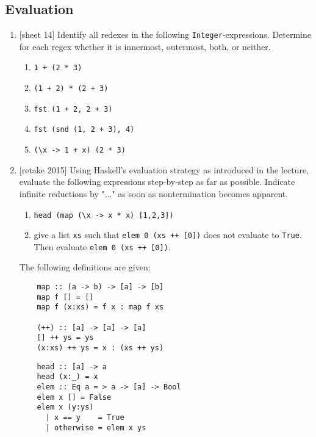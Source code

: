 \documentclass{article}
\def\code#1{\texttt{#1}}
\begin{document}
\subsection{Evaluation}
\begin{enumerate}
    \item {[sheet 14]} Identify all redexes in the following \code{Integer}-expressions. Determine for each regex whether it is innermost, outermost, both, or neither.
        \begin{enumerate}
            \item \code{1 + (2 * 3)}
            \item \code{(1 + 2) * (2 + 3)}
            \item \code{fst (1 + 2, 2 + 3)}
            \item \code{fst (snd (1, 2 + 3), 4)}
            \item \code{(\textbackslash x -> 1 + x) (2 * 3)}
        \end{enumerate}

    \item {[retake 2015]} Using Haskell's evaluation strategy as introduced in the lecture, evaluate the following expressions step-by-step as far as possible. Indicate infinite reductions by "..." as soon as nontermination becomes apparent.
        \begin{enumerate}
            \item \code{head (map (\textbackslash x -> x * x) [1,2,3])}
            \item give a list \code{xs} such that \code{elem 0 (xs ++ [0])} does not evaluate to \code{True}. Then evaluate \code{elem 0 (xs ++ [0])}.
        \end{enumerate}
        The following definitions are given:
        \begin{multicols}{2}
        \begin{verbatim}
    map :: (a -> b) -> [a] -> [b]
    map f [] = []
    map f (x:xs) = f x : map f xs

    (++) :: [a] -> [a] -> [a]
    [] ++ ys = ys
    (x:xs) ++ ys = x : (xs ++ ys)
        \end{verbatim}
        \begin{verbatim}
    head :: [a] -> a
    head (x:_) = x
    elem :: Eq a = > a -> [a] -> Bool
    elem x [] = False
    elem x (y:ys)
      | x == y    = True
      | otherwise = elem x ys
        \end{verbatim}
        \end{multicols}


\end{enumerate}
\end{document}
